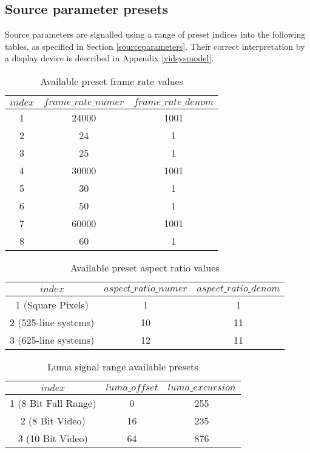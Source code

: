 \subsection{Source parameter presets}
\label{sourceparamspresets}

Source parameters are signalled using a range of preset indices into the following
tables, as specified in Section \ref{sourceparameters}. Their correct
interpretation by a display device is described in Appendix \ref{vidsysmodel}.

\begin{table}[!ht]
\centering
\begin{tabular}{|c|c|c|}
\hline
$index$ & $frame\_rate\_numer$ & $frame\_rate\_denom$ \\
\hline
1 & 24000 & 1001 \\
\hline
2 & 24 & 1 \\
\hline
3 & 25 & 1 \\
\hline
4 & 30000 & 1001 \\
\hline
5 & 30 & 1 \\
\hline
6 & 50 & 1 \\
\hline
7 & 60000 & 1001 \\
\hline
8 & 60 & 1 \\
\hline
\end{tabular}
\caption{Available preset frame rate values}\label{table:frameratevalues}
\end{table}

\begin{table}[!ht]
\centering
\begin{tabular}{|c|c|c|}
\hline
$index$ & $aspect\_ratio\_numer$ & $aspect\_ratio\_denom$ \\
\hline
1 (Square Pixels) & 1 & 1 \\
\hline
2 (525-line systems) & 10 & 11 \\
\hline
3 (625-line systems) & 12 & 11 \\
\hline
\end{tabular}
\caption{Available preset aspect ratio values}\label{table:aspectratiovalues}
\end{table}

\begin{table}[!ht]
\centering
\begin{tabular}{|c|c|c|}
\hline
$index$ & $luma\_offset$ & $luma\_excursion$ \\
\hline
1 (8 Bit Full Range) & 0 & 255 \\
\hline
2 (8 Bit Video) & 16 & 235 \\
\hline
3 (10 Bit Video) & 64 & 876 \\
\hline
\end{tabular}
\caption{Luma signal range available presets}\label{table:lumasignalrangevalues}
\end{table}

